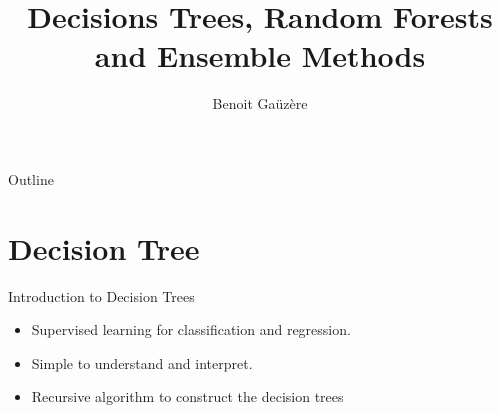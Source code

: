 \documentclass[11pt]{beamer}
\title{Decisions Trees, Random Forests and Ensemble Methods}
\author{Benoit Gaüzère}
\institute{INSA Rouen Normandie - Laboratoire LITIS}
\begin{document}
\maketitle


\begin{frame}{Outline}
  \tableofcontents
\end{frame}

\section{Decision Tree}
\begin{frame}{Introduction to Decision Trees}
    \begin{itemize}
        \item Supervised learning for classification and regression.
        \item Simple to understand and interpret.
        \item Recursive algorithm to construct the decision trees
    \end{itemize}

    
\end{frame}
\end{document}
